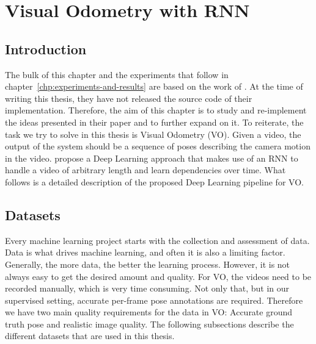 \chapter{Visual Odometry with RNN}\label{chp:the_model}
	\def\CC{{C\nolinebreak[4]\hspace{-.05em}\raisebox{.4ex}{\tiny\bf ++}}}

	\section{Introduction}
		The bulk of this chapter and the experiments that follow in chapter~\ref{chp:experiments-and-results} are based on the work of \cite{wang2017deepvo}.
		At the time of writing this thesis, they have not released the source code of their implementation.
		Therefore, the aim of this chapter is to study and re-implement the ideas presented in their paper and to further expand on it.
		To reiterate, the task we try to solve in this thesis is Visual Odometry (VO).
		Given a video, the output of the system should be a sequence of poses describing the camera motion in the video.
		\citeauthor{wang2017deepvo} propose a Deep Learning approach that makes use of an RNN to handle a video of arbitrary length and learn dependencies over time.
		What follows is a detailed description of the proposed Deep Learning pipeline for VO.
		
	\section{Datasets}
		Every machine learning project starts with the collection and assessment of data.
		Data is what drives machine learning, and often it is also a limiting factor.
		Generally, the more data, the better the learning process.
		However, it is not always easy to get the desired amount and quality.
		For VO, the videos need to be recorded manually, which is very time consuming.
		Not only that, but in our supervised setting, accurate per-frame pose annotations are required.
		Therefore we have two main quality requirements for the data in VO: Accurate ground truth pose and realistic image quality.
		The following subsections describe the different datasets that are used in this thesis.
		
